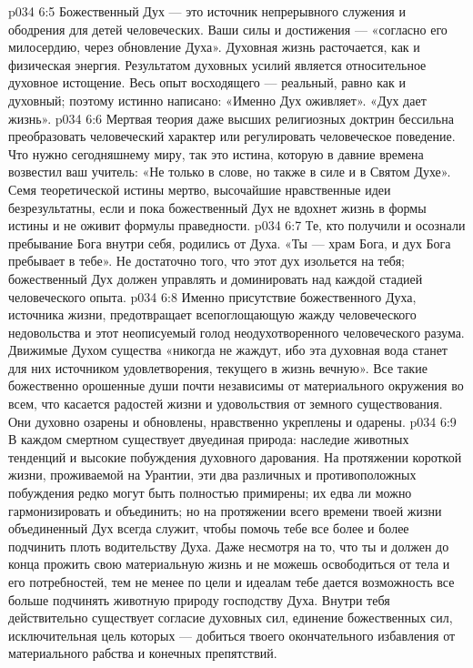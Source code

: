 \vs p034 6:5 \pc Божественный Дух --- это источник непрерывного служения и ободрения для детей человеческих. Ваши силы и достижения --- «согласно его милосердию, через обновление Духа». Духовная жизнь расточается, как и физическая энергия. Результатом духовных усилий является относительное духовное истощение. Весь опыт восходящего --- реальный, равно как и духовный; поэтому истинно написано: «Именно Дух оживляет». «Дух дает жизнь».
\vs p034 6:6 Мертвая теория даже высших религиозных доктрин бессильна преобразовать человеческий характер или регулировать человеческое поведение. Что нужно сегодняшнему миру, так это истина, которую в давние времена возвестил ваш учитель: «Не только в слове, но также в силе и в Святом Духе». Семя теоретической истины мертво, высочайшие нравственные идеи безрезультатны, если и пока божественный Дух не вдохнет жизнь в формы истины и не оживит формулы праведности.
\vs p034 6:7 Те, кто получили и осознали пребывание Бога внутри себя, родились от Духа. «Ты --- храм Бога, и дух Бога пребывает в тебе». Не достаточно того, что этот дух изольется на тебя; божественный Дух должен управлять и доминировать над каждой стадией человеческого опыта.
\vs p034 6:8 Именно присутствие божественного Духа, источника жизни, предотвращает всепоглощающую жажду человеческого недовольства и этот неописуемый голод неодухотворенного человеческого разума. Движимые Духом существа «никогда не жаждут, ибо эта духовная вода станет для них источником удовлетворения, текущего в жизнь вечную». Все такие божественно орошенные души почти независимы от материального окружения во всем, что касается радостей жизни и удовольствия от земного существования. Они духовно озарены и обновлены, нравственно укреплены и одарены.
\vs p034 6:9 \pc В каждом смертном существует двуединая природа: наследие животных тенденций и высокие побуждения духовного дарования. На протяжении короткой жизни, проживаемой на Урантии, эти два различных и противоположных побуждения редко могут быть полностью примирены; их едва ли можно гармонизировать и объединить; но на протяжении всего времени твоей жизни объединенный Дух всегда служит, чтобы помочь тебе все более и более подчинить плоть водительству Духа. Даже несмотря на то, что ты и должен до конца прожить свою материальную жизнь и не можешь освободиться от тела и его потребностей, тем не менее по цели и идеалам тебе дается возможность все больше подчинять животную природу господству Духа. Внутри тебя действительно существует согласие духовных сил, единение божественных сил, исключительная цель которых --- добиться твоего окончательного избавления от материального рабства и конечных препятствий.

